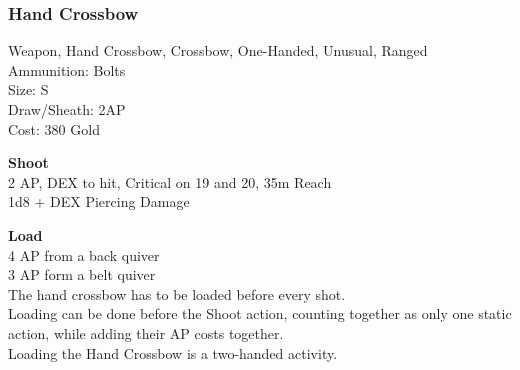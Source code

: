 \subsubsection{Hand Crossbow}\label{weapon:handCrossbow}
Weapon, Hand Crossbow, Crossbow, One-Handed, Unusual, Ranged\\
Ammunition: Bolts\\
Size: S\\
Draw/Sheath: 2AP\\
Cost: 380 Gold

\textbf{Shoot} \\
2 AP, DEX to hit, Critical on 19 and 20, 35m Reach\\
1d8 + \texttimes DEX Piercing Damage

\textbf{Load} \\
4 AP from a back quiver\\
3 AP form a belt quiver\\
The hand crossbow has to be loaded before every shot.\\
Loading can be done before the Shoot action, counting together as only one static action, while adding their AP costs together.\\
Loading the Hand Crossbow is a two-handed activity.
